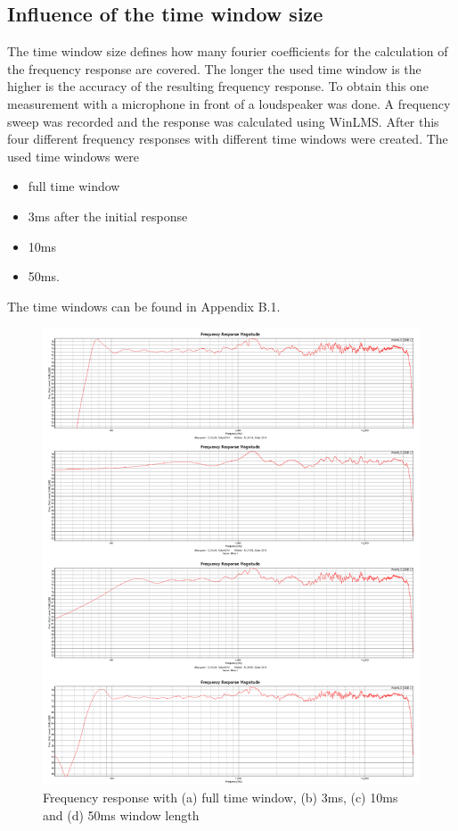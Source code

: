 \documentclass{article}
\begin{document}
\subsection{Influence of the time window size}
The time window size defines how many fourier coefficients for the calculation of the frequency response are covered. The longer the used time window is the higher is the accuracy of the resulting frequency response. To obtain this one measurement with a microphone in front of a loudspeaker was done. A frequency sweep was recorded and the response was calculated using WinLMS. After this four different frequency responses with different time windows were created. The used time windows were 
\begin{itemize}
\item full time window
\item 3ms after the initial response
\item 10ms 
\item 50ms.
\end{itemize}
The time windows can be found in Appendix B.1.
\begin{figure}[htbp]
\begin{center}
\includegraphics[width=15cm,keepaspectratio=true]{Figures/TaskAcombined}
\caption{Frequency response with (a) full time window, (b) 3ms, (c) 10ms and (d) 50ms window length}
\label{fig:TaskAcombined}
\end{center}
\end{figure}
\end{document}
